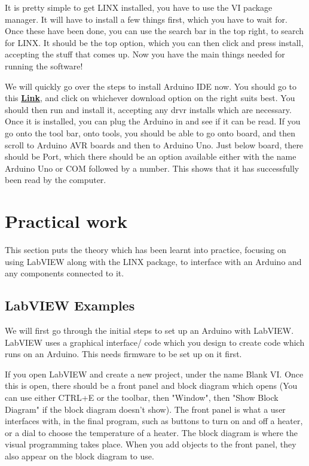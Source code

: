 \documentclass[a4paper,11pt]{report}
\let\oldhref\href %
\renewcommand{\href}[2]{\oldhref{#1}{\bfseries#2}}
\begin{document}
It is pretty simple to get LINX installed, you have to use the VI package manager. It will have to install a few things first, which you have to wait for. Once these have been done, you can use the search bar in the top right, to search for LINX. It should be the top option, which you can then click and press install, accepting the stuff that comes up. Now you have the main things needed for running the software!

We will quickly go over the steps to install Arduino IDE now. You should go to this \href{https://www.arduino.cc/en/software}{Link}, and click on whichever download option on the right suits best. You should then run and install it, accepting any \gls{drvr} installs which are necessary. Once it is installed, you can plug the Arduino in and see if it can be read. If you go onto the tool bar, onto tools, you should be able to go onto board, and then scroll to Arduino AVR boards and then to Arduino Uno. Just below board, there should be Port, which there should be an option available either with the name Arduino Uno or COM followed by a number. This shows that it has successfully been read by the computer.

\pagebreak

\section{Practical work}

This section puts the theory which has been learnt into practice, focusing on using LabVIEW along with the LINX package, to interface with an Arduino and any components connected to it.

\vspace*{1\baselineskip}

\subsection{LabVIEW Examples}

We will first go through the initial steps to set up an Arduino with LabVIEW. LabVIEW uses a graphical interface/ code which you design to create code which runs on an Arduino. This needs firmware to be set up on it first.

If you open LabVIEW and create a new project, under the name Blank VI. Once this is open, there should be a front panel and block diagram which opens (You can use either CTRL+E or the toolbar, then "Window", then "Show Block Diagram" if the block diagram doesn't show). The front panel is what a user interfaces with, in the final program, such as buttons to turn on and off a heater, or a dial to choose the temperature of a heater. The block diagram is where the visual programming takes place. When you add objects to the front panel, they also appear on the block diagram to use.
\end{document}

